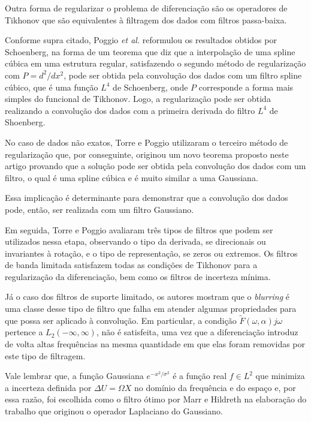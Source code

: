 \begin{enumerate}
\begin{enumerate}[label*=\arabic*.]
    Outra forma de regularizar o problema de diferenciação são os operadores de Tikhonov que são equivalentes à filtragem dos dados com filtros passa-baixa.
    
    Conforme supra citado, Poggio \textit{et al.} \cite{Poggio1988106} reformulou os resultados obtidos por Schoenberg, na forma de um teorema que diz que a interpolação de uma spline cúbica em uma estrutura regular, satisfazendo o segundo método de regularização com $P = d^2 / dx^2$, pode ser obtida pela convolução dos dados com um filtro spline cúbico, que é uma função $L^4$ de Schoenberg, onde $P$ corresponde a forma mais simples do funcional de Tikhonov. Logo, a regularização pode ser obtida realizando a convolução dos dados com a primeira derivada do filtro $L^4$ de Shoenberg.
    
    No caso de dados não exatos, Torre e Poggio utilizaram o terceiro método de regularização que, por conseguinte, originou um novo teorema proposto neste artigo provando que a solução pode ser obtida pela convolução dos dados com um filtro, o qual é uma spline cúbica e é muito similar a uma Gaussiana.
    
    Essa implicação é determinante para demonstrar que a convolução dos dados pode, então, ser realizada com um filtro Gaussiano.
    
    Em seguida, Torre e Poggio avaliaram três tipos de filtros que podem ser utilizados nessa etapa, observando o tipo da derivada, se direcionais ou invariantes à rotação, e o tipo de representação, se zeros ou extremos. Os filtros de banda limitada satisfazem todas as condições de Tikhonov para a regularização da diferenciação, bem como os filtros de incerteza mínima.
    
    Já o caso dos filtros de suporte limitado, os autores mostram que o \textit{blurring} é uma classe desse tipo de filtro que falha em atender algumas propriedades para que possa ser aplicado à convolução. Em particular, a condição $\tilde{F}(\omega, \alpha) j\omega$ pertence a $L_{2}(-\infty, \infty)$, não é satisfeita, uma vez que a diferenciação introduz de volta altas frequências na mesma quantidade em que elas foram removidas por este tipo de filtragem.
    
    Vale lembrar que, a função Gaussiana $e^{-x^2/\sigma^2}$ é a função real $f \in L^2$ que minimiza a incerteza definida por $\Delta U = \Omega X$ no domínio da frequência e do espaço e, por essa razão, foi escolhida como o filtro ótimo por Marr e Hildreth na elaboração do trabalho que originou o operador Laplaciano do Gaussiano.
    

\end{enumerate}
\end{enumerate}
